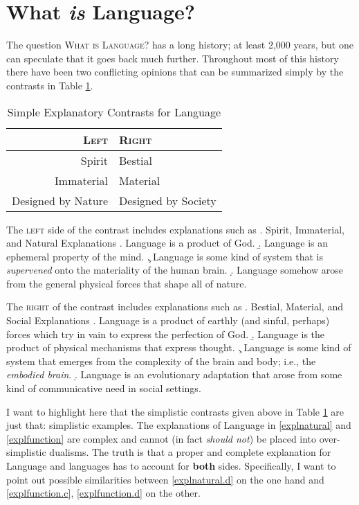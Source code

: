 \documentclass[11pt]{book}%
\theoremstyle{plain}
\numberwithin{equation}{section}
\theoremstyle{definition}
\newtheorem{phrase string}{Phrase String}
\begin{document}
\section{What \textsl{is} Language?}
The question \textsc{What is Language?} has a long history; at least 2,000 years, but one can speculate that it goes back much further. Throughout most of this history there have been two conflicting opinions that can be summarized simply by the contrasts in Table \ref{contrasts}.

\begin{table}[!h]
\caption{Simple Explanatory Contrasts for Language}\label{contrasts}
\begin{center}
\begin{tabular}{|r||l|}
\hline
\textsc{Left}&\textsc{Right}\\
\hline
\hline
Spirit&Bestial\\
Immaterial&Material\\
Designed by Nature&Designed by Society\\
\hline
\end{tabular}
\end{center}
\end{table}


The \textsc{left} side of the contrast includes explanations such as
\ex. Spirit, Immaterial, and Natural Explanations\label{explnatural}
\a. Language is a product of God. 
\b. Language is an ephemeral property of the mind. 
\c. Language is some kind of system that is \textsl{supervened} onto the materiality of the human brain.
\d. Language somehow arose from the general physical forces that shape all of nature.\label{explnatural.d}
 
The \textsc{right} of the contrast includes explanations such as 
\ex. Bestial, Material, and Social Explanations\label{explfunction}
\a. Language is a product of earthly (and sinful, perhaps) forces which try in vain to express the perfection of God. 
\b. Language is the product of physical mechanisms that express thought. 
\c. Language is some kind of system that emerges from the complexity of the brain and body; i.e., the \textsl{embodied brain}.\label{explfunction.c}
\d. Language is an evolutionary  adaptation that arose from some kind of communicative need in social settings.\label{explfunction.d} 

I want to highlight here that the simplistic contrasts given above in Table \ref{contrasts} are just that: simplistic examples. The explanations of Language in \ref{explnatural} and \ref{explfunction} are complex and cannot (in fact \textsl{should not}) be placed into over-simplistic dualisms. The truth is that a proper and complete explanation for Language and languages has to account for \textbf{both} sides. Specifically, I want to point out possible similarities between \ref{explnatural.d} on the one hand and \ref{explfunction.c}, \ref{explfunction.d} on the other. 
\end{document}
